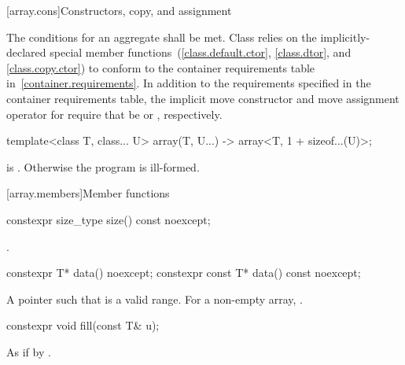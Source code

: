 [array.cons]{Constructors, copy, and assignment}

\pnum
{}%
%
The conditions for an aggregate shall be
met. Class  relies on the implicitly-declared special
member functions~(\ref{class.default.ctor}, \ref{class.dtor}, and \ref{class.copy.ctor}) to
conform to the container requirements table in~\ref{container.requirements}.
In addition to the requirements specified in the container requirements table,
the implicit move constructor and move assignment operator for 
require that  be  or ,
respectively.

\begin{itemdecl}
template<class T, class... U>
  array(T, U...) -> array<T, 1 + sizeof...(U)>;
\end{itemdecl}
\begin{itemdescr}
\pnum
\requires {} is . Otherwise the program is ill-formed.
\end{itemdescr}

[array.members]{Member functions}

%
\begin{itemdecl}
constexpr size_type size() const noexcept;
\end{itemdecl}

\begin{itemdescr}
\pnum\returns {}.
\end{itemdescr}

%
\begin{itemdecl}
constexpr T* data() noexcept;
constexpr const T* data() const noexcept;
\end{itemdecl}

\begin{itemdescr}
\pnum \returns
A pointer such that  is a valid range. For a
non-empty array,  \tcode{==} .
\end{itemdescr}

%
\begin{itemdecl}
constexpr void fill(const T& u);
\end{itemdecl}

\begin{itemdescr}
\pnum
\effects As if by .
\end{itemdescr}

